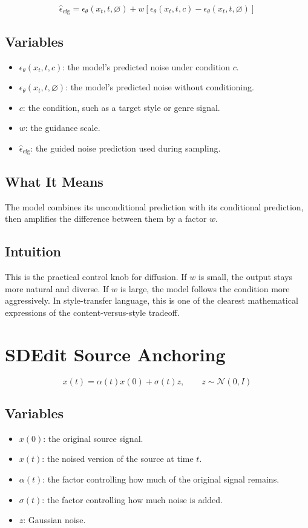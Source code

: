 \documentclass[11pt]{article}
\begin{document}
\begin{equation*}
\hat{\epsilon}_{\mathrm{cfg}}=
\epsilon_{\theta}(x_t,t,\varnothing)+
w\left[\epsilon_{\theta}(x_t,t,c)-\epsilon_{\theta}(x_t,t,\varnothing)\right]
\end{equation*}

\subsection*{Variables}
\begin{itemize}
\item \(\epsilon_{\theta}(x_t,t,c)\): the model's predicted noise under condition \(c\).
\item \(\epsilon_{\theta}(x_t,t,\varnothing)\): the model's predicted noise without conditioning.
\item \(c\): the condition, such as a target style or genre signal.
\item \(w\): the guidance scale.
\item \(\hat{\epsilon}_{\mathrm{cfg}}\): the guided noise prediction used during sampling.
\end{itemize}

\subsection*{What It Means}
The model combines its unconditional prediction with its conditional prediction, then amplifies the difference between them by a factor \(w\).

\subsection*{Intuition}
This is the practical control knob for diffusion. If \(w\) is small, the output stays more natural and diverse. If \(w\) is large, the model follows the condition more aggressively. In style-transfer language, this is one of the clearest mathematical expressions of the content-versus-style tradeoff.

\section{SDEdit Source Anchoring}

\begin{equation*}
x(t)=\alpha(t)x(0)+\sigma(t)z,\qquad z\sim\mathcal{N}(0,I)
\end{equation*}

\subsection*{Variables}
\begin{itemize}
\item \(x(0)\): the original source signal.
\item \(x(t)\): the noised version of the source at time \(t\).
\item \(\alpha(t)\): the factor controlling how much of the original signal remains.
\item \(\sigma(t)\): the factor controlling how much noise is added.
\item \(z\): Gaussian noise.
\end{itemize}
\end{document}
